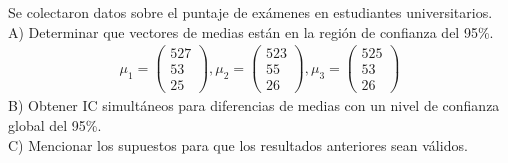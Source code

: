 \begin{problem}{4}
Se colectaron datos sobre el puntaje de exámenes en estudiantes universitarios. \\
A) Determinar que vectores de medias están en la región de confianza del 95\%.
\begin{align*}
\mu_1 = \begin{pmatrix}527 \\ 53 \\ 25 \end{pmatrix}, 
\mu_2 = \begin{pmatrix}523 \\ 55 \\ 26 \end{pmatrix}, 
\mu_3 = \begin{pmatrix} 525 \\ 53 \\ 26 \end{pmatrix}
\end{align*}
B) Obtener IC simultáneos para diferencias de medias con un nivel de confianza global del 95\%.\\
C) Mencionar los supuestos para que los resultados anteriores sean válidos.
\end{problem}

